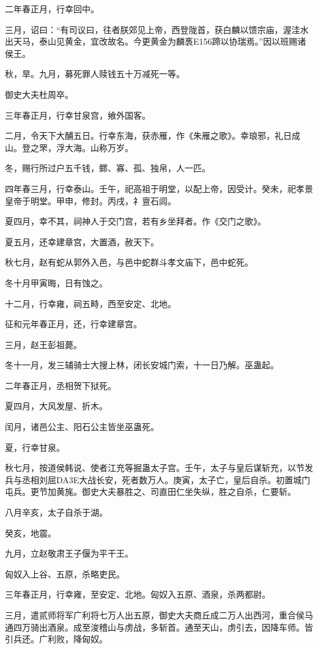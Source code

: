 \documentclass[]{article}
\begin{document}
二年春正月，行幸回中。

三月，诏曰：``有司议曰，往者朕郊见上帝，西登陇首，获白麟以馈宗庙，渥洼水出天马，泰山见黄金，宜改故名。今更黄金为麟褭E156蹄以协瑞焉。''因以班赐诸侯王。

秋，旱。九月，募死罪人赎钱五十万减死一等。

御史大夫杜周卒。

三年春正月，行幸甘泉宫，飨外国客。

二月，令天下大酺五日。行幸东海，获赤雁，作《朱雁之歌》。幸琅邪，礼日成山。登之罘，浮大海。山称万岁。

冬，赐行所过户五千钱，鳏、寡、孤、独帛，人一匹。

四年春三月，行幸泰山。壬午，祀高祖于明堂，以配上帝，因受计。癸未，祀孝景皇帝于明堂。甲申，修封。丙戌，礻亶石闾。

夏四月，幸不其，祠神人于交门宫，若有乡坐拜者。作《交门之歌》。

夏五月，还幸建章宫，大置酒，赦天下。

秋七月，赵有蛇从郭外入邑，与邑中蛇群斗孝文庙下，邑中蛇死。

冬十月甲寅晦，日有蚀之。

十二月，行幸雍，祠五畤，西至安定、北地。

征和元年春正月，还，行幸建章宫。

三月，赵王彭祖薨。

冬十一月，发三辅骑士大搜上林，闭长安城门索，十一日乃解。巫蛊起。

二年春正月，丞相贺下狱死。

夏四月，大风发屋、折木。

闰月，诸邑公主、阳石公主皆坐巫蛊死。

夏，行幸甘泉。

秋七月，按道侯韩说、使者江充等掘蛊太子宫。壬午，太子与皇后谋斩充，以节发兵与丞相刘屈DA3E大战长安，死者数万人。庚寅，太子亡，皇后自杀。初置城门屯兵。更节加黄旄。御史大夫暴胜之、司直田仁坐失纵，胜之自杀，仁要斩。

八月辛亥，太子自杀于湖。

癸亥，地震。

九月，立赵敬肃王子偃为平干王。

匈奴入上谷、五原，杀略吏民。

三年春正月，行幸雍，至安定、北地。匈奴入五原、酒泉，杀两都尉。

三月，遣贰师将军广利将七万人出五原，御史大夫商丘成二万人出西河，重合侯马通四万骑出酒泉。成至浚稽山与虏战，多斩首。通至天山，虏引去，因降车师。皆引兵还。广利败，降匈奴。
\end{document}
